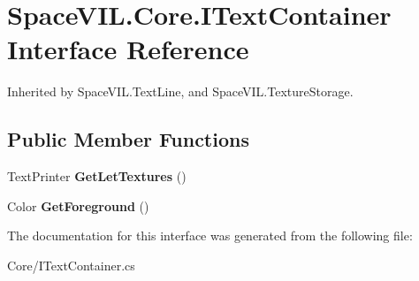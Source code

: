 \hypertarget{interface_space_v_i_l_1_1_core_1_1_i_text_container}{}\section{Space\+V\+I\+L.\+Core.\+I\+Text\+Container Interface Reference}
\label{interface_space_v_i_l_1_1_core_1_1_i_text_container}


Inherited by Space\+V\+I\+L.\+Text\+Line, and Space\+V\+I\+L.\+Texture\+Storage.

\subsection*{Public Member Functions}
\begin{DoxyCompactItemize}
\item 
\mbox{\label{interface_space_v_i_l_1_1_core_1_1_i_text_container_aa51708fd741b26cdabdf9825b131da6c}} 
Text\+Printer {\bfseries Get\+Let\+Textures} ()
\item 
\mbox{\label{interface_space_v_i_l_1_1_core_1_1_i_text_container_aa09ac2cb53b07fd1d0ad0945e69597d7}} 
Color {\bfseries Get\+Foreground} ()
\end{DoxyCompactItemize}


The documentation for this interface was generated from the following file\+:\begin{DoxyCompactItemize}
\item 
Core/I\+Text\+Container.\+cs\end{DoxyCompactItemize}
